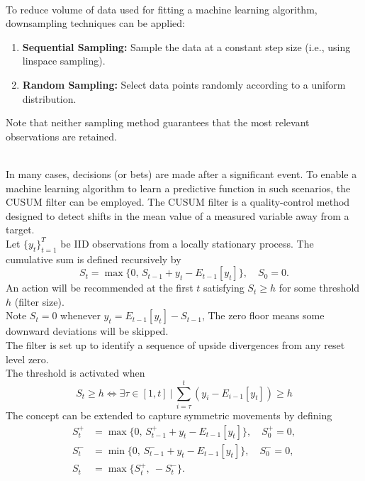 \begin{method} \\
To reduce volume of data used for fitting a machine learning algorithm, downsampling techniques can be applied:
\begin{enumerate}[label=\roman*.]
\setlength{\itemsep}{0pt}
\item \textbf{Sequential Sampling:} Sample the data at a constant step size (i.e., using linspace sampling).
\item \textbf{Random Sampling:} Select data points randomly according to a uniform distribution.
\end{enumerate}
Note that neither sampling method guarantees that the most relevant observations are retained.
\end{method}

\begin{method}  \\
In many cases, decisions (or bets) are made after a significant event. To enable a machine learning algorithm to learn a predictive function in such scenarios, the CUSUM filter can be employed. The CUSUM filter is a quality-control method designed to detect shifts in the mean value of a measured variable away from a target.\\
Let $\{y_t\}_{t=1}^{T}$ be IID observations from a locally stationary process. The cumulative sum is defined recursively by
\[ S_t = \max\{0,\, S_{t-1} + y_t - E_{t-1}[y_t]\}, \quad S_0 = 0. \]
An action will be recommended at the first $t$ satisfying $S_t \geq h$ for some threshold $h$ (filter size).\\
Note $S_t = 0$ whenever $y_t = E_{t-1}[y_t] - S_{t-1}$, The zero floor means some downward deviations will be skipped.\\
The filter is set up to identify a sequence of upside divergences from any reset level zero.\\
The threshold is activated when
\begin{equation}
S_t \geq h \Leftrightarrow \exists \tau \in [1, t] \ \vert \ \sum\limits_{i=\tau}^t (y_i - E_{i-1}[y_t]) \geq h \nonumber
\end{equation}
The concept can be extended to capture symmetric movements by defining
\begin{align}
S^+_t &= \max\{0,\, S^+_{t-1} + y_t - E_{t-1}[y_t]\}, \quad S^+_0 = 0, \nonumber \\
S^-_t &= \min\{0,\, S^-_{t-1} + y_t - E_{t-1}[y_t]\}, \quad S^-_0 = 0, \nonumber \\
S_t   &= \max\{S^+_t,\ -S^-_t\}. \nonumber
\end{align}
\end{method}